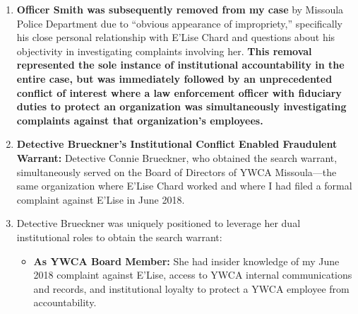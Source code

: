 \documentclass[12pt,letterpaper]{article}
\begin{document}
\begin{enumerate}
\begin{itemize}
\item Fabricated phone conversations with my parents regarding my phone numbers and technical capabilities that my parents explicitly deny ever occurred;

\item False claims that my mother ``alluded to'' mental health issues, which both my parents categorically deny stating;

\item Mischaracterization of my professional IT skills as evidence of criminal intent rather than legitimate career expertise;

\item Reliance on E'Lise Chard's uncorroborated and contradictory allegations without independent verification.\footnote{See Exhibit 10, Section 2.2-2.3: MT-DOJ-POST-Complaint-Page1.jpeg and MT-DOJ-POST-Complaint-Page2.jpeg (formal POST complaint to Montana DOJ documenting fabricated evidence, conflict of interest, and misconduct by Smith and Brueckner).}
\end{itemize}

\item \textbf{Officer Smith was subsequently removed from my case} by Missoula Police Department due to ``obvious appearance of impropriety,'' specifically his close personal relationship with E'Lise Chard and questions about his objectivity in investigating complaints involving her. \textbf{This removal represented the sole instance of institutional accountability in the entire case, but was immediately followed by an unprecedented conflict of interest where a law enforcement officer with fiduciary duties to protect an organization was simultaneously investigating complaints against that organization's employees.}

\item \textbf{Detective Brueckner's Institutional Conflict Enabled Fraudulent Warrant:} Detective Connie Brueckner, who obtained the search warrant, simultaneously served on the Board of Directors of YWCA Missoula---the same organization where E'Lise Chard worked and where I had filed a formal complaint against E'Lise in June 2018.

\item Detective Brueckner was uniquely positioned to leverage her dual institutional roles to obtain the search warrant:

\begin{itemize}
\item \textbf{As YWCA Board Member:} She had insider knowledge of my June 2018 complaint against E'Lise, access to YWCA internal communications and records, and institutional loyalty to protect a YWCA employee from accountability.


\end{itemize}
\end{enumerate}
\end{document}
